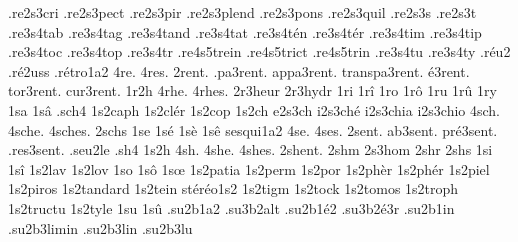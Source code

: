 {                    .re2s3cri
                    .re2s3pect
                    .re2s3pir
                    .re2s3plend
                    .re2s3pons
                    .re2s3quil
                    .re2s3s
                    .re2s3t
                    .re3s4tab
                    .re3s4tag
                    .re3s4tand
                    .re3s4tat
                    .re3s4tén
                    .re3s4tér
                    .re3s4tim
                    .re3s4tip
                    .re3s4toc
                    .re3s4top
                    .re3s4tr
                    .re4s5trein
                    .re4s5trict
                    .re4s5trin
                    .re3s4tu
                    .re3s4ty
                    .réu2 %
                    .ré2uss
                    .rétro1a2
4re.
4res.
       2rent. %
    .pa3rent.
   appa3rent.
transpa3rent.
    é3rent.
    tor3rent.
    cur3rent.
%
1r2h
4rhe.
4rhes.
                    2r3heur
                    2r3hydr
1ri
1rî
1ro
1rô
1ru
1rû
1ry
1sa
1sâ
.sch4
                    1s2caph
                    1s2clér
                    1s2cop
 1s2ch
e2s3ch
i2s3ché
i2s3chia
i2s3chio
4sch.
4sche.
4sches.
2schs
1se
1sé
1sè
1sê
                    sesqui1a2
4se.
4ses.
    2sent. %
  ab3sent.
 pré3sent.
.res3sent.
%
.seu2le %
.sh4
1s2h
4sh.
4she.
4shes.
2shent. %
2shm
                    2s3hom
2shr
2shs
1si
1sî
                    1s2lav
                    1s2lov
1so
1sô
1sœ
                    1s2patia
                    1s2perm
                    1s2por
                    1s2phèr
                    1s2phér
                    1s2piel
                    1s2piros
                    1s2tandard
                    1s2tein
                    stéréo1s2
                    1s2tigm
                    1s2tock
                    1s2tomos
                    1s2troph
                    1s2tructu
                    1s2tyle
1su
1sû
                    .su2b1a2
                    .su3b2alt
                    .su2b1é2
                    .su3b2é3r
                    .su2b1in
                    .su2b3limin
                    .su2b3lin
                    .su2b3lu
}
